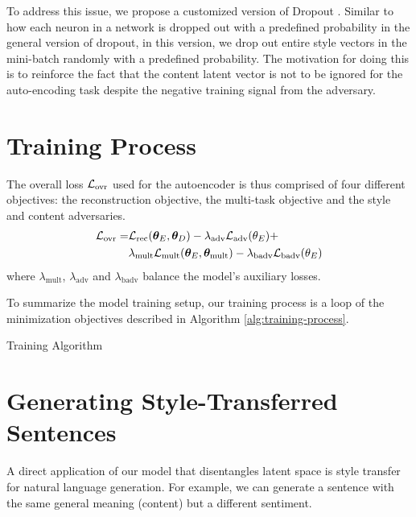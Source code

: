 To address this issue, we propose a customized version of Dropout \citep{srivastava2014dropout}. Similar to how each neuron in a network is dropped out with a predefined probability in the general version of dropout, in this version, we drop out entire style vectors in the mini-batch randomly with a predefined probability. The motivation for doing this is to reinforce the fact that the content latent vector is not to be ignored for the auto-encoding task despite the negative training signal from the adversary.


\section{Training Process} \label{sec:training-process}

The overall loss $\mathcal{L}_\text{ovr}$ used for the autoencoder is thus comprised of four different objectives: the reconstruction objective, the multi-task objective and the style and content adversaries.
\begin{align*}
	\mathcal{L}_\text{ovr} =
	 & \mathcal{L}_\text{rec}(\bm\theta_E, \bm\theta_D) - \lambda_\text{adv} \mathcal{L}_\text{adv}(\theta_E) +                                \\
	 & \lambda_\text{mult} \mathcal{L}_\text{mult} (\bm\theta_E,\bm\theta_\text{mult}) - \lambda_\text{badv} \mathcal{L}_\text{badv}(\theta_E)
\end{align*}
where $\lambda_\text{mult}$, $\lambda_\text{adv}$ and $\lambda_\text{badv}$ balance the model's auxiliary losses.

To summarize the model training setup, our training process is a loop of the minimization objectives described in Algorithm \ref{alg:training-process}.

\begin{algorithm}[H]
	\caption{\label{alg:training-process} Training Algorithm}
\end{algorithm}


\section{Generating Style-Transferred Sentences} \label{sec:generating-novel-text}

A direct application of our model that disentangles latent space is style transfer for natural language generation. For example, we can generate a sentence with the same general meaning (content) but a different sentiment.

